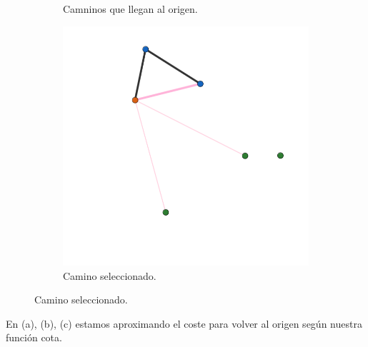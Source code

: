 \documentclass{article}
\begin{document}
\begin{figure}[H]
\begin{subfigure}[b]{0.35\textwidth}
        \caption{Camninos que llegan al origen.}
    \end{subfigure}
    \begin{subfigure}[b]{0.45\textwidth}
        \centering
        \includegraphics[width=\textwidth]{imagenes/Grafos/Screenshots/Origen2.png}
        \caption{Camino seleccionado.}
    \end{subfigure}
\end{figure}
En (a), (b), (c) estamos aproximando el coste para volver al origen según nuestra función cota. 
\end{document}
